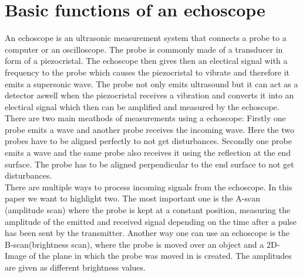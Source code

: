 \section{Basic functions of an echoscope}

    An echoscope is an ultrasonic measurement system that connects a probe to a computer or an oscilloscope. The probe is commonly made of a transducer in form 
    of a piezocristal. The echoscope then gives then an electical signal with a frequency to the probe which causes the piezocristal to vibrate and therefore
    it emits a supersonic wave. The probe not only emits ultrasound but it can act as a detector aswell when the piezocristal receives a vibration and converts
    it into an electical signal which then can be amplified and measured by the echoscope.\\
    There are two main meathods of measurements using a echoscope: Firstly one probe emits a wave and another probe receives the incoming wave. Here the two
    probes have to be aligned perfectly to not get disturbances. Secondly one probe emits a wave and the same probe also receives it using the reflection at
    the end surface. The probe has to be aligned perpendicular to the end surface to not get disturbances. \\
    There are multiple ways to process incoming signals from the echoscope. In this paper we want to highlight two. The most important one is the A-scan
    (amplitude scan) where the probe is kept at a constant position, measuring the amplitude of the emitted and received signal depending on the time after
    a pulse has been sent by the transmitter. Another way one can use an echoscope is the B-scan(brightness scan), where the probe is moved over an object
    and a 2D-Image of the plane in which the probe was moved in is created. The amplitudes are given as different brightness values.